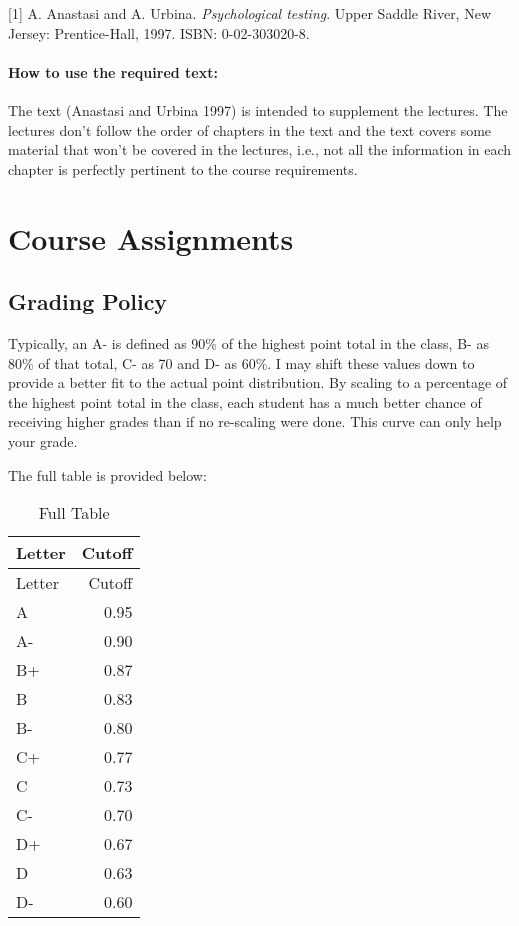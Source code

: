 \documentclass[11pt,]{article}
\begin{document}
{[}1{]} A. Anastasi and A. Urbina. \emph{Psychological testing}. Upper
Saddle River, New Jersey: Prentice-Hall, 1997. ISBN: 0-02-303020-8.

\hypertarget{how-to-use-the-required-text}{%
\paragraph{How to use the required
text:}\label{how-to-use-the-required-text}}

The text (Anastasi and Urbina 1997) is intended to supplement the
lectures. The lectures don't follow the order of chapters in the text
and the text covers some material that won't be covered in the lectures,
i.e., not all the information in each chapter is perfectly pertinent to
the course requirements.

\hypertarget{course-assignments}{%
\section{Course Assignments}\label{course-assignments}}

\hypertarget{grading-policy}{%
\subsection{Grading Policy}\label{grading-policy}}

Typically, an A- is defined as 90\% of the highest point total in the
class, B- as 80\% of that total, C- as 70 and D- as 60\%. I may shift
these values down to provide a better fit to the actual point
distribution. By scaling to a percentage of the highest point total in
the class, each student has a much better chance of receiving higher
grades than if no re-scaling were done. This curve can only help your
grade.

The full table is provided below:

\begin{longtable}[]{@{}lr@{}}
\caption{Full Table}\tabularnewline
\toprule
Letter & Cutoff \\
\midrule
\endfirsthead
\toprule
Letter & Cutoff \\
\midrule
\endhead
A & 0.95 \\
A- & 0.90 \\
B+ & 0.87 \\
B & 0.83 \\
B- & 0.80 \\
C+ & 0.77 \\
C & 0.73 \\
C- & 0.70 \\
D+ & 0.67 \\
D & 0.63 \\
D- & 0.60 \\
\bottomrule
\end{longtable}
\end{document}
